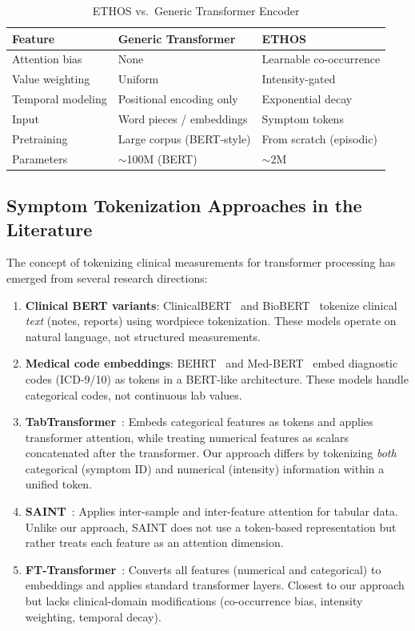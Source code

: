 \begin{table}[htbp]
\centering
\caption{ETHOS vs.\ Generic Transformer Encoder}
\small
\begin{tabular}{lll}
\toprule
\textbf{Feature} & \textbf{Generic Transformer} & \textbf{ETHOS} \\
\midrule
Attention bias & None & Learnable co-occurrence \\
Value weighting & Uniform & Intensity-gated \\
Temporal modeling & Positional encoding only & Exponential decay \\
Input & Word pieces / embeddings & Symptom tokens \\
Pretraining & Large corpus (BERT-style) & From scratch (episodic) \\
Parameters & $\sim$100M (BERT) & $\sim$2M \\
\bottomrule
\end{tabular}
\label{tab:ethos_vs_generic}
\end{table}

\subsection{Symptom Tokenization Approaches in the Literature}

The concept of tokenizing clinical measurements for transformer processing has emerged from several research directions:

\begin{enumerate}
\item \textbf{Clinical BERT variants}: ClinicalBERT~\cite{alsentzer2019publicly} and BioBERT~\cite{lee2020biobert} tokenize clinical \emph{text} (notes, reports) using wordpiece tokenization. These models operate on natural language, not structured measurements.
\item \textbf{Medical code embeddings}: BEHRT~\cite{li2020behrt} and Med-BERT~\cite{rasmy2021med} embed diagnostic codes (ICD-9/10) as tokens in a BERT-like architecture. These models handle categorical codes, not continuous lab values.
\item \textbf{TabTransformer}~\cite{huang2020tabtransformer}: Embeds categorical features as tokens and applies transformer attention, while treating numerical features as scalars concatenated after the transformer. Our approach differs by tokenizing \emph{both} categorical (symptom ID) and numerical (intensity) information within a unified token.
\item \textbf{SAINT}~\cite{somepalli2021saint}: Applies inter-sample and inter-feature attention for tabular data. Unlike our approach, SAINT does not use a token-based representation but rather treats each feature as an attention dimension.
\item \textbf{FT-Transformer}~\cite{gorishniy2024revisiting}: Converts all features (numerical and categorical) to embeddings and applies standard transformer layers. Closest to our approach but lacks clinical-domain modifications (co-occurrence bias, intensity weighting, temporal decay).
\end{enumerate}


